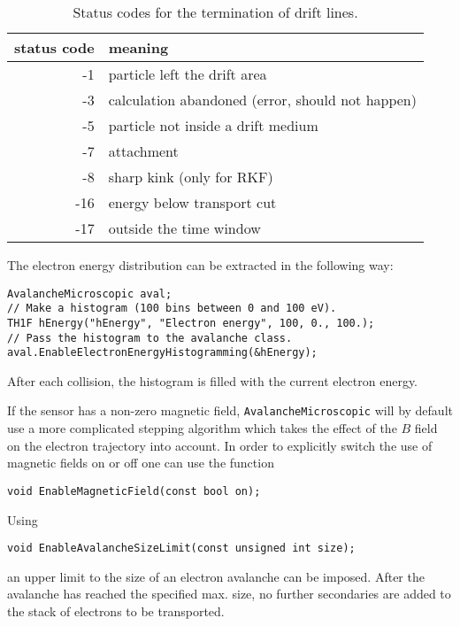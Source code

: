 \begin{table}
  \centering
  \caption{Status codes for the termination of drift lines.}
  \label{Tab:DriftLineStatusCodes}
  \begin{tabular}{r l}
    \toprule
    status code &  meaning\\
    \midrule
     -1 & particle left the drift area        \\
     -3 & calculation abandoned (error, should not happen) \\
     -5 & particle not inside a drift medium  \\
     -7 & attachment                          \\
     -8 & sharp kink (only for RKF)           \\
    -16 & energy below transport cut          \\
    -17 & outside the time window             \\
    \bottomrule
  \end{tabular}
\end{table}

The electron energy distribution can be extracted in the following way:
\begin{lstlisting}
AvalancheMicroscopic aval;
// Make a histogram (100 bins between 0 and 100 eV).
TH1F hEnergy("hEnergy", "Electron energy", 100, 0., 100.);
// Pass the histogram to the avalanche class.
aval.EnableElectronEnergyHistogramming(&hEnergy);
\end{lstlisting} 
After each collision, 
the histogram is filled with the current electron energy. 

If the sensor has a non-zero magnetic field, \texttt{AvalancheMicroscopic} 
will by default use a more complicated stepping algorithm which takes
the effect of the $B$ field on the electron trajectory into account.
In order to explicitly switch the use of magnetic fields on or off 
one can use the function
\begin{lstlisting}
void EnableMagneticField(const bool on);
\end{lstlisting}

Using 
\begin{lstlisting}
void EnableAvalancheSizeLimit(const unsigned int size);
\end{lstlisting}
an upper limit to the size of an electron avalanche can be imposed.
After the avalanche has reached the specified max. size, 
no further secondaries are added to the stack of electrons to be transported.  

